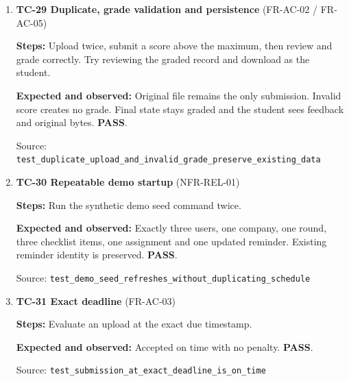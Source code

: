 \begin{enumerate}
\item \begin{minipage}[t]{\linewidth}\textbf{TC-29 Duplicate, grade validation and persistence } (FR-AC-02 / FR-AC-05)\par

\textbf{Steps:} Upload twice, submit a score above the maximum, then review and grade correctly. Try reviewing the graded record and download as the student.\par

\textbf{Expected and observed:} Original file remains the only submission. Invalid score creates no grade. Final state stays graded and the student sees feedback and original bytes. \textbf{PASS}.\par

{\footnotesize Source: \nolinkurl{test_duplicate_upload_and_invalid_grade_preserve_existing_data}}\end{minipage}

\item \begin{minipage}[t]{\linewidth}\textbf{TC-30 Repeatable demo startup } (NFR-REL-01)\par

\textbf{Steps:} Run the synthetic demo seed command twice.\par

\textbf{Expected and observed:} Exactly three users, one company, one round, three checklist items, one assignment and one updated reminder. Existing reminder identity is preserved. \textbf{PASS}.\par

{\footnotesize Source: \nolinkurl{test_demo_seed_refreshes_without_duplicating_schedule}}\end{minipage}

\item \begin{minipage}[t]{\linewidth}\textbf{TC-31 Exact deadline } (FR-AC-03)\par

\textbf{Steps:} Evaluate an upload at the exact due timestamp.\par

\textbf{Expected and observed:} Accepted on time with no penalty. \textbf{PASS}.\par

{\footnotesize Source: \nolinkurl{test_submission_at_exact_deadline_is_on_time}}\end{minipage}


\end{enumerate}
